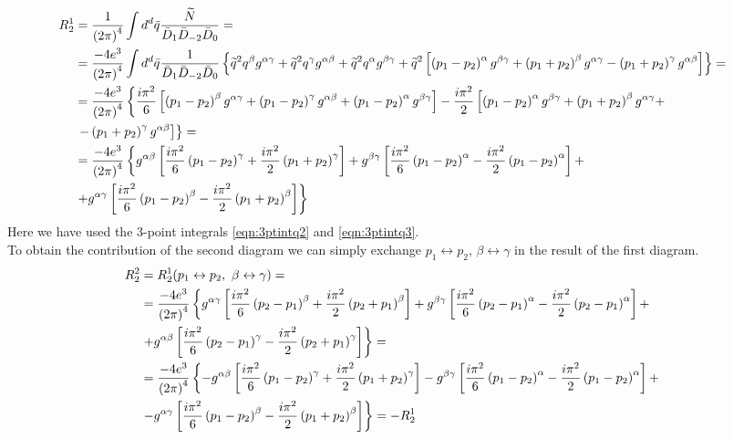 \begin{align*}
R_2^1 & = \frac{1}{\left( 2\pi \right)^4} \int d^d\bar{q} \frac{\widetilde{N}}{\bar{D}_1\bar{D}_{-2}\bar{D}_0} = & \\
& = \frac{-4e^3}{\left( 2\pi \right)^4} \int d^d \bar{q} \frac{1}{\bar{D}_1\bar{D}_{-2}\bar{D}_0} \left\lbrace \widetilde{q}^2q^{\beta}g^{\alpha\gamma} + \widetilde{q}^2q^{\gamma}g^{\alpha\beta} + \widetilde{q}^2q^{\alpha}g^{\beta\gamma} + \widetilde{q}^2 \left[ \left( p_1 - p_2 \right)^{\alpha} g^{\beta\gamma} + \left( p_1 + p_2 \right)^{\beta} g^{\alpha\gamma} - \left( p_1 + p_2 \right)^{\gamma} g^{\alpha\beta} \right] \right\rbrace = & \\
& = \frac{-4e^3}{\left( 2\pi \right)^4} \left\lbrace \frac{i\pi^2}{6} \left[ \left( p_1-p_2 \right)^{\beta}g^{\alpha\gamma} + \left( p_1-p_2 \right)^{\gamma}g^{\alpha\beta} + \left( p_1-p_2 \right)^{\alpha}g^{\beta\gamma} \right] - \frac{i\pi^2}{2} \left[ \left( p_1-p_2 \right)^{\alpha} g^{\beta\gamma} + \left( p_1+p_2 \right)^{\beta} g^{\alpha\gamma} + \right. \right. & \\
& \left. \left. - \left( p_1+p_2 \right)^{\gamma} g^{\alpha\beta} \right] \right\rbrace = & \\
& = \frac{-4e^3}{\left( 2\pi \right)^4} \left\lbrace g^{\alpha\beta} \left[ \frac{i\pi^2}{6} \left( p_1-p_2 \right)^{\gamma} + \frac{i\pi^2}{2} \left( p_1+p_2 \right)^{\gamma} \right] + g^{\beta\gamma} \left[ \frac{i\pi^2}{6} \left( p_1-p_2 \right)^{\alpha} - \frac{i\pi^2}{2} \left( p_1-p_2 \right)^{\alpha} \right] + \right. & \\
& \left. + g^{\alpha\gamma} \left[ \frac{i\pi^2}{6} \left( p_1-p_2 \right)^{\beta} - \frac{i\pi^2}{2} \left( p_1+p_2 \right)^{\beta} \right] \right\rbrace &
\end{align*}
Here we have used the 3-point integrals \ref{eqn:3ptintq2} and \ref{eqn:3ptintq3}.\\
To obtain the contribution of the second diagram we can simply exchange $p_1 \leftrightarrow p_2$, $\beta \leftrightarrow \gamma$ in the result of the first diagram.
\begin{align*}
R_2^2 & = R_2^1(p_1 \leftrightarrow p_2, \ \beta \leftrightarrow \gamma) = & \\
& = \frac{-4e^3}{\left( 2\pi \right)^4} \left\lbrace g^{\alpha\gamma} \left[ \frac{i\pi^2}{6} \left( p_2-p_1 \right)^{\beta} + \frac{i\pi^2}{2} \left( p_2+p_1 \right)^{\beta} \right] + g^{\beta\gamma} \left[ \frac{i\pi^2}{6} \left( p_2-p_1 \right)^{\alpha} - \frac{i\pi^2}{2} \left( p_2-p_1 \right)^{\alpha} \right] + \right. & \\
& \left. + g^{\alpha\beta} \left[ \frac{i\pi^2}{6} \left( p_2-p_1 \right)^{\gamma} - \frac{i\pi^2}{2} \left( p_2+p_1 \right)^{\gamma} \right] \right\rbrace = & \\
& = \frac{-4e^3}{\left( 2\pi \right)^4} \left\lbrace -g^{\alpha\beta} \left[ \frac{i\pi^2}{6} \left( p_1-p_2 \right)^{\gamma} + \frac{i\pi^2}{2} \left( p_1+p_2 \right)^{\gamma} \right] - g^{\beta\gamma} \left[ \frac{i\pi^2}{6} \left( p_1-p_2 \right)^{\alpha} - \frac{i\pi^2}{2} \left( p_1-p_2 \right)^{\alpha} \right] + \right. & \\
& \left. - g^{\alpha\gamma} \left[ \frac{i\pi^2}{6} \left( p_1-p_2 \right)^{\beta} - \frac{i\pi^2}{2} \left( p_1+p_2 \right)^{\beta} \right] \right\rbrace = -R_2^1 &
\end{align*}
